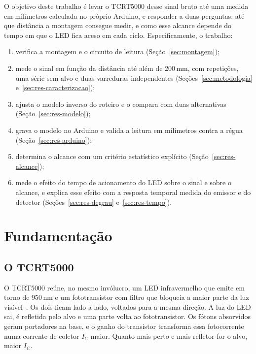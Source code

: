 \documentclass[11pt,a4paper]{article}
\begin{document}
O objetivo deste trabalho é levar o TCRT5000 desse sinal bruto até uma medida em milímetros calculada no próprio Arduino, e responder a duas perguntas: até que distância a montagem consegue medir, e como esse alcance depende do tempo em que o LED fica aceso em cada ciclo. Especificamente, o trabalho:
\begin{enumerate}[nosep]
  \item verifica a montagem e o circuito de leitura (Seção~\ref{sec:montagem});
  \item mede o sinal em função da distância até além de 200\,mm, com repetições, uma série sem alvo e duas varreduras independentes (Seções~\ref{sec:metodologia} e~\ref{sec:res-caracterizacao});
  \item ajusta o modelo inverso do roteiro e o compara com duas alternativas (Seção~\ref{sec:res-modelo});
  \item grava o modelo no Arduino e valida a leitura em milímetros contra a régua (Seção~\ref{sec:res-arduino});
  \item determina o alcance com um critério estatístico explícito (Seção~\ref{sec:res-alcance});
  \item mede o efeito do tempo de acionamento do LED sobre o sinal e sobre o alcance, e explica esse efeito com a resposta temporal medida do emissor e do detector (Seções~\ref{sec:res-degrau} e~\ref{sec:res-tempo}).
\end{enumerate}

\section{Fundamentação}
\label{sec:fundamentacao}

\subsection{O TCRT5000}

O TCRT5000 reúne, no mesmo invólucro, um LED infravermelho que emite em torno de 950\,nm e um fototransistor com filtro que bloqueia a maior parte da luz visível~\cite{tcrt5000}. Os dois ficam lado a lado, voltados para a mesma direção. A luz do LED sai, é refletida pelo alvo e uma parte volta ao fototransistor. Os fótons absorvidos geram portadores na base, e o ganho do transistor transforma essa fotocorrente numa corrente de coletor $I_C$ maior. Quanto mais perto e mais refletor for o alvo, maior $I_C$.
\end{document}
